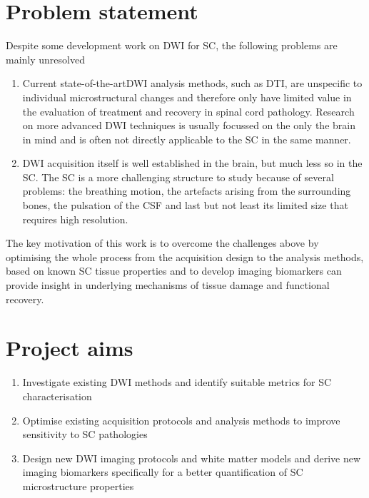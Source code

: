 

\section{Problem statement}
Despite some development work on \gls{DWI} for \gls{SC}, the following problems are mainly unresolved 
\begin{enumerate}
\item Current state-of-the-art\gls{DWI} analysis methods, such as \gls{DTI}, are unspecific to individual microstructural changes and therefore only have limited value in the evaluation of treatment and recovery in spinal cord pathology. Research on more advanced \gls{DWI} techniques is usually focussed on the only the brain in mind and is often not directly applicable to the \gls{SC} in the same manner.
\item \gls{DWI} acquisition itself is well established in the brain, but much less so in the \gls{SC}. The \gls{SC} is a more challenging structure to study because of several problems: the breathing motion, the artefacts arising from the surrounding bones, the pulsation of the {\gls{CSF}} and last but not least its limited size that requires high resolution.  
\end{enumerate} 
The key motivation of this work is to overcome the challenges above by optimising the whole process from the acquisition design to the analysis methods, based on known \gls{SC} tissue properties and to develop imaging biomarkers can provide insight in underlying mechanisms of tissue damage and functional recovery.

\section{Project aims}
\begin{enumerate}
  \item Investigate existing \gls{DWI} methods and identify suitable metrics for \gls{SC} characterisation
  \item Optimise existing acquisition protocols and analysis methods to improve sensitivity to \gls{SC} pathologies
  \item Design new \gls{DWI} imaging protocols and white matter models and derive new imaging biomarkers specifically for a better quantification of \gls{SC} microstructure properties
\end{enumerate}

